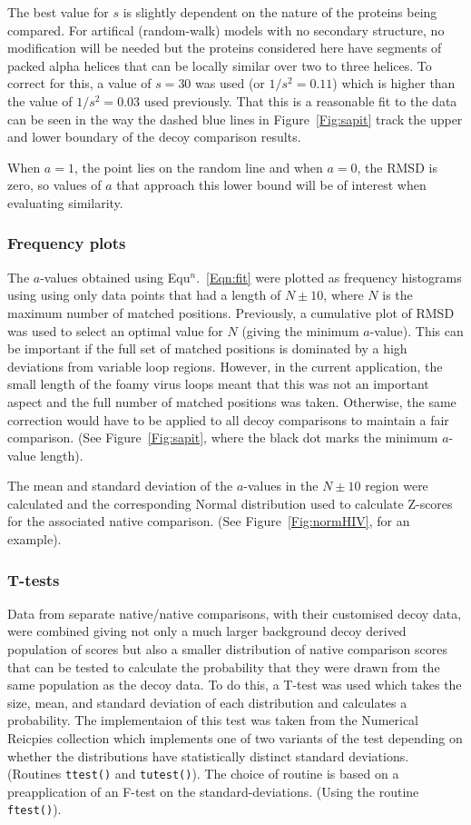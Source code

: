 \documentclass[12pt]{article}
\newcommand{\Eqn}[1]{Equ$^n$.~\ref{Eqn:#1}}
\newcommand{\Fig}[1]{Figure~\ref{Fig:#1}}
\newcommand{\3}{$3_{10}$}
\begin{document}
The best value for $s$ is slightly dependent on the nature of the proteins being compared.
For artifical (random-walk)  models with no secondary structure, no modification will be needed but the
proteins considered here have segments of packed alpha helices that can be locally similar
over two to three helices.   To correct for this, a value of $s=30$ was used (or $1/s^2 = 0.11$)
which is higher than the value of $1/s^2 = 0.03$ used previously.
That this is a reasonable fit to the data can be seen in the way the dashed blue lines
in \Fig{sapit} track the upper and lower boundary of the decoy comparison results.

When $a=1$, the point lies on the random line and when $a=0$, the RMSD is zero, so values of
$a$ that approach this lower bound will be of interest when evaluating similarity. 

\subsubsection{Frequency plots}

The $a$-values obtained using \Eqn{fit} were plotted as frequency histograms using using
only data points that had a length of $N\pm 10$, where $N$ is the maximum number of matched
positions.   Previously, a cumulative plot of RMSD was used to select an optimal value for
$N$ (giving the minimum $a$-value).   This can be important if the full set of matched
positions is dominated by a high deviations from variable loop regions.   However, in the
current application, the small length of the foamy virus loops meant that this was not
an important aspect and the full number of matched positions was taken.   Otherwise, the
same correction would have to be applied to all decoy comparisons to maintain a fair
comparison.  (See \Fig{sapit}, where the black dot marks the minimum $a$-value length).

The mean and standard deviation of the $a$-values in the $N\pm10$ region were calculated
and the corresponding Normal distribution used to calculate Z-scores for the associated
native comparison. (See \Fig{normHIV}, for an example).

\subsubsection{T-tests}

Data from separate native/native comparisons, with their customised decoy data, were combined
giving not only a much larger background decoy derived population of scores but also a smaller
distribution of native comparison scores that can be tested to calculate the probability that
they were drawn from the same population as the decoy data.  To do this, a T-test was used which
takes the size, mean, and standard deviation of each distribution and calculates a probability.
The implementaion of this test was taken from the Numerical Reicpies collection \cite{PressWHet86}
which implements one of two variants of the test depending on whether the distributions
have statistically distinct standard deviations. (Routines {\tt ttest()} and {\tt tutest()}).  
The choice of routine is based on a preapplication of an F-test on the standard-deviations. 
(Using the routine {\tt ftest()}).
\end{document}
